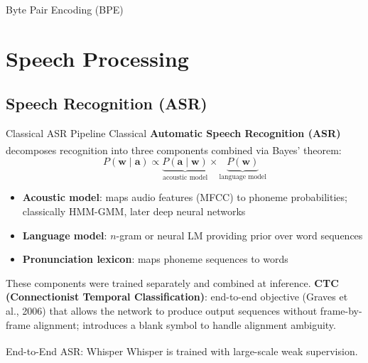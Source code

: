 \begin{v3topic}{Byte Pair Encoding (BPE)}
\section{Speech Processing}

\subsection{Speech Recognition (ASR)}

\begin{v3topic}{Classical ASR Pipeline}
    Classical \textbf{Automatic Speech Recognition (ASR)} decomposes recognition into three components combined via Bayes' theorem\textsuperscript{\cite[][p.~11]{dhamaniIntroductionGenerativeAI2024}}:
    \begin{equation}
        P(\mathbf{w} \mid \mathbf{a}) \propto \underbrace{P(\mathbf{a} \mid \mathbf{w})}_{\text{acoustic model}} \times \underbrace{P(\mathbf{w})}_{\text{language model}}
    \end{equation}
    \begin{itemize}
        \item \textbf{Acoustic model}: maps audio features (MFCC) to phoneme probabilities; classically HMM-GMM, later deep neural networks
        \item \textbf{Language model}: $n$-gram or neural LM providing prior over word sequences
        \item \textbf{Pronunciation lexicon}: maps phoneme sequences to words
    \end{itemize}
    These components were trained separately and combined at inference.
    \textbf{CTC (Connectionist Temporal Classification)}: end-to-end objective (Graves et al., 2006) that allows the network to produce output sequences without frame-by-frame alignment; introduces a blank symbol to handle alignment ambiguity.

\end{v3topic}
\begin{v3topic}{End-to-End ASR: Whisper}
    Whisper is trained with large-scale weak
    supervision\textsuperscript{\cite{radfordRobustSpeechRecognition2023}}.


\end{v3topic}
\end{v3topic}
